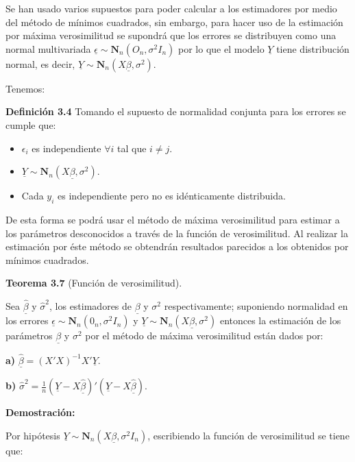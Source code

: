 \documentclass[a4paper,oneside,openany]{book}
\begin{document}
Se han usado varios supuestos para poder calcular a los estimadores por
medio del método de mínimos cuadrados, sin embargo, para hacer uso de la
estimación por máxima verosimilitud se supondrá que los errores se
distribuyen como una normal multivariada
\(\underline{\epsilon} \sim \mathbf{N}_{n}(O_{n},\sigma^2 I_{n})\) por
lo que el modelo \(\underline{Y}\) tiene distribución normal, es decir,
\(\underline{Y} \sim \mathbf{N}_n (X\underline{\beta},\sigma^2).\)

Tenemos:

\textbf{Definición 3.4} Tomando el supuesto de normalidad conjunta para
los errores se cumple que:

\begin{itemize}
\item
  \(\epsilon_{i}\) es independiente \(\forall i\) tal que \(i \neq j.\)
\item
  \(\underline{Y}\sim \mathbf{N}_{n}(X\underline{\beta},\sigma^2).\)
\item
  Cada \(y_{i}\) es independiente pero no es idénticamente distribuida.
\end{itemize}

De esta forma se podrá usar el método de máxima verosimilitud para
estimar a los parámetros desconocidos a través de la función de
verosimilitud. Al realizar la estimación por éste método se obtendrán
resultados parecidos a los obtenidos por mínimos cuadrados.

\textbf{Teorema 3.7} (Función de verosimilitud).

Sea \(\underline{\hat{\beta}}\) y \(\hat{\sigma}^2\), los estimadores de
\(\underline{\beta}\) y \(\sigma^2\) respectivamente; suponiendo
normalidad en los errores
\(\underline{\epsilon} \sim \mathbf{N}_{n}(0_{n},\sigma^2 I_{n})\) y
\(\underline{Y}\sim \mathbf{N}_{n}(X \underline{\beta},\sigma^2)\)
entonces la estimación de los parámetros \(\underline{\beta}\) y
\(\sigma^2\) por el método de máxima verosimilitud están dados por:

\textbf{a)} \(\underline{\hat{\beta}}=(X'X)^{-1}X'\underline{Y}\).

\textbf{b)}
\(\hat{\sigma}^2=\frac{1}{n}\left( \underline{Y}-X\underline{\hat{\beta}}\right)'\left(\underline{Y}-X \underline{\hat{\beta}}\right).\)

\textbf{Demostración:}

Por hipótesis
\(\underline{Y}\sim \mathbf{N}_{n}(X\underline{\beta},\sigma^2 I_{n})\),
escribiendo la función de verosimilitud se tiene que:
\end{document}

